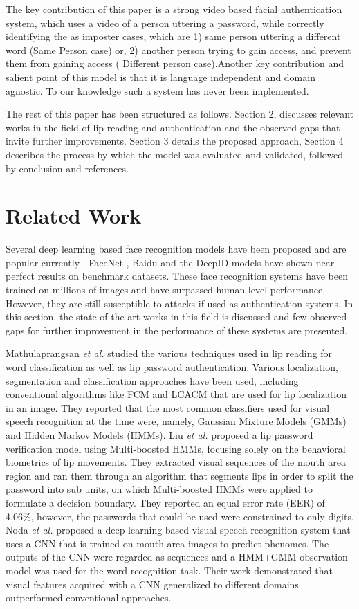 \documentclass[letterpaper]{article}
\begin{document}
The key contribution of this paper is a strong video based facial authentication system, which uses a video of a person uttering a password, while correctly identifying the as imposter cases, which are 1) same person uttering a different word (Same Person case) or, 2) another person trying to gain access, and prevent them from gaining access ( Different person case).Another key contribution and salient point of this model is that it is language independent and domain agnostic. To our knowledge such a system has never been implemented.

The rest of this paper has been structured as follows. Section 2, discusses relevant works in the field of lip reading and authentication and the observed gaps that invite further improvements. Section 3 details the proposed approach, Section 4 describes the process by which the model was evaluated and validated, followed by conclusion and references.

\section{Related Work}

Several deep learning based face recognition models have been proposed and are popular currently \cite{facesurvey}. FaceNet \cite{facenet}, Baidu \cite{baidu} and the DeepID models \cite{deepnet,deepId2,deepid3} have shown near perfect results on benchmark datasets. These face recognition systems have been trained on millions of images and have surpassed human-level performance. However, they are still susceptible to attacks if used as authentication systems. In this section, the state-of-the-art works in this field is discussed and few observed gaps for further improvement in the performance of these systems are presented.

Mathulaprangsan \textit{et al.} \cite{lipreadsurvey} studied the various techniques used in lip reading for word classification as well as lip password authentication. Various localization, segmentation and classification approaches have been used, including conventional algorithms like FCM and LCACM that are used for lip localization in an image. They reported that the most common classifiers used for visual speech recognition at the time were, namely, Gaussian Mixture Models (GMMs) and Hidden Markov Models (HMMs). Liu \textit{et al.} \cite{lipbio} proposed a lip password verification model using Multi-boosted HMMs, focusing solely on the behavioral biometrics of lip movements. They extracted visual sequences of the mouth area region and ran them through an algorithm that segments lips in order to split the password into sub units, on which Multi-boosted HMMs were applied to formulate a decision boundary. They reported an equal error rate (EER) of 4.06\%, however, the passwords that could be used were constrained to only digits. Noda \textit{et al.} \cite{CNNlipreading} proposed a deep learning based visual speech recognition system that uses a CNN that is trained on mouth area images to predict phenomes. The outputs of the CNN were regarded as sequences and a HMM+GMM observation model was used for the word recognition task. Their work demonstrated that visual features acquired with a CNN generalized to different domains outperformed conventional approaches. 
\end{document}
